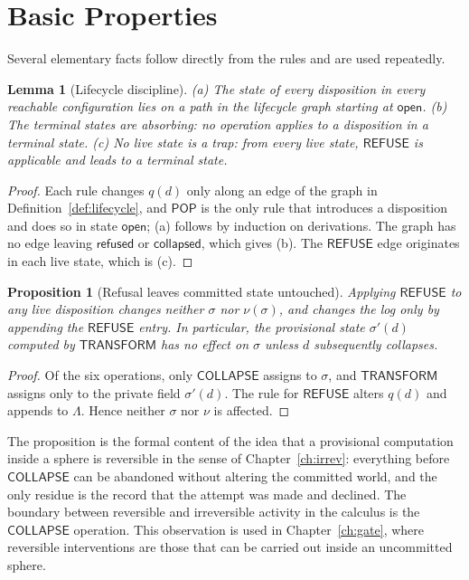 \documentclass[11pt,twoside,openright]{book}
\theoremstyle{plain}
\newtheorem{proposition}[theorem]{Proposition}
\newtheorem{lemma}[theorem]{Lemma}
\theoremstyle{definition}
\theoremstyle{remark}
\newcommand{\pop}{\mathsf{POP}}
\newcommand{\refuse}{\mathsf{REFUSE}}
\newcommand{\transform}{\mathsf{TRANSFORM}}
\newcommand{\collapse}{\mathsf{COLLAPSE}}
\begin{document}
\section{Basic Properties}

Several elementary facts follow directly from the rules and are used repeatedly.

\begin{lemma}[Lifecycle discipline]\label{lem:lifecycle}
(a) The state of every disposition in every reachable configuration lies on a path in the lifecycle graph starting at $\mathsf{open}$. (b) The terminal states are absorbing: no operation applies to a disposition in a terminal state. (c) No live state is a trap: from every live state, $\refuse$ is applicable and leads to a terminal state.
\end{lemma}

\begin{proof}
Each rule changes $q(d)$ only along an edge of the graph in Definition~\ref{def:lifecycle}, and $\pop$ is the only rule that introduces a disposition and does so in state $\mathsf{open}$; (a) follows by induction on derivations. The graph has no edge leaving $\mathsf{refused}$ or $\mathsf{collapsed}$, which gives (b). The $\refuse$ edge originates in each live state, which is (c).
\end{proof}

\begin{proposition}[Refusal leaves committed state untouched]\label{prop:refusal}
Applying $\refuse$ to any live disposition changes neither $\sigma$ nor $\nu(\sigma)$, and changes the log only by appending the $\refuse$ entry. In particular, the provisional state $\sigma'(d)$ computed by $\transform$ has no effect on $\sigma$ unless $d$ subsequently collapses.
\end{proposition}

\begin{proof}
Of the six operations, only $\collapse$ assigns to $\sigma$, and $\transform$ assigns only to the private field $\sigma'(d)$. The rule for $\refuse$ alters $q(d)$ and appends to $\Lambda$. Hence neither $\sigma$ nor $\nu$ is affected.
\end{proof}

The proposition is the formal content of the idea that a provisional computation inside a sphere is reversible in the sense of Chapter~\ref{ch:irrev}: everything before $\collapse$ can be abandoned without altering the committed world, and the only residue is the record that the attempt was made and declined. The boundary between reversible and irreversible activity in the calculus is the $\collapse$ operation. This observation is used in Chapter~\ref{ch:gate}, where reversible interventions are those that can be carried out inside an uncommitted sphere.
\end{document}
